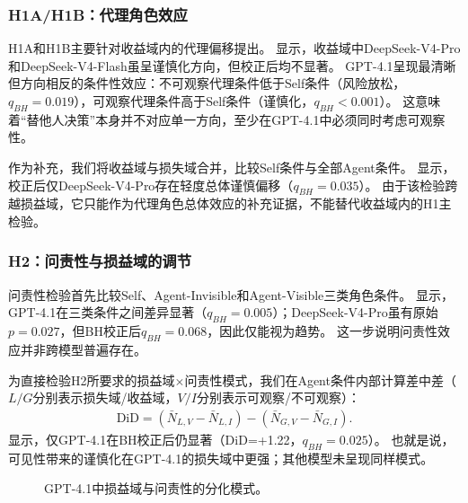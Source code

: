 \subsubsection{H1A/H1B：代理角色效应}

H1A和H1B主要针对收益域内的代理偏移提出。
显示，收益域中DeepSeek-V4-Pro和DeepSeek-V4-Flash虽呈谨慎化方向，但校正后均不显著。
GPT-4.1呈现最清晰但方向相反的条件性效应：不可观察代理条件低于Self条件（风险放松，$q_{BH}=0.019$），可观察代理条件高于Self条件（谨慎化，$q_{BH}<0.001$）。
这意味着“替他人决策”本身并不对应单一方向，至少在GPT-4.1中必须同时考虑可观察性。



作为补充，我们将收益域与损失域合并，比较Self条件与全部Agent条件。
显示，校正后仅DeepSeek-V4-Pro存在轻度总体谨慎偏移（$q_{BH}=0.035$）。
由于该检验跨越损益域，它只能作为代理角色总体效应的补充证据，不能替代收益域内的H1主检验。



\subsubsection{H2：问责性与损益域的调节}

问责性检验首先比较Self、Agent-Invisible和Agent-Visible三类角色条件。
显示，GPT-4.1在三类条件之间差异显著（$q_{BH}=0.005$）；DeepSeek-V4-Pro虽有原始$p=0.027$，但BH校正后$q_{BH}=0.068$，因此仅能视为趋势。
这一步说明问责性效应并非跨模型普遍存在。



为直接检验H2所要求的损益域$\times$问责性模式，我们在Agent条件内部计算差中差（$L/G$分别表示损失域/收益域，$V/I$分别表示可观察/不可观察）：
\[
  \begin{aligned}
  \text{DiD}
  =(\bar N_{L,V}-\bar N_{L,I})
  -(\bar N_{G,V}-\bar N_{G,I}).
  \end{aligned}
\]
显示，仅GPT-4.1在BH校正后仍显著（DiD=+1.22，$q_{BH}=0.025$）。
也就是说，可见性带来的谨慎化在GPT-4.1的损失域中更强；其他模型未呈现同样模式。



\begin{figure}[!htbp]
  \centering
  \makebox[\linewidth][c]{\hspace*{-0.140\linewidth}\resizebox{0.92\linewidth}{!}{}}
  \caption{GPT-4.1中损益域与问责性的分化模式。}
  \label{fig:gpt_interaction}
\end{figure}

